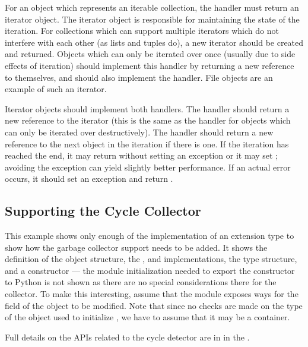For an object which represents an iterable collection, the
 handler must return an iterator object.  The iterator
object is responsible for maintaining the state of the iteration.  For
collections which can support multiple iterators which do not
interfere with each other (as lists and tuples do), a new iterator
should be created and returned.  Objects which can only be iterated
over once (usually due to side effects of iteration) should implement
this handler by returning a new reference to themselves, and should
also implement the  handler.  File objects are an
example of such an iterator.

Iterator objects should implement both handlers.  The 
handler should return a new reference to the iterator (this is the
same as the  handler for objects which can only be
iterated over destructively).  The  handler should
return a new reference to the next object in the iteration if there is
one.  If the iteration has reached the end, it may return \NULL{}
without setting an exception or it may set ;
avoiding the exception can yield slightly better performance.  If an
actual error occurs, it should set an exception and return \NULL.


\subsection{Supporting the Cycle Collector
            \label{example-cycle-support}}

This example shows only enough of the implementation of an extension
type to show how the garbage collector support needs to be added.  It
shows the definition of the object structure, the
,  and 
implementations, the type structure, and a constructor --- the module
initialization needed to export the constructor to Python is not shown
as there are no special considerations there for the collector.  To
make this interesting, assume that the module exposes ways for the
 field of the object to be modified.  Note that
since no checks are made on the type of the object used to initialize
, we have to assume that it may be a container.



Full details on the APIs related to the cycle detector are in
 in the
.


